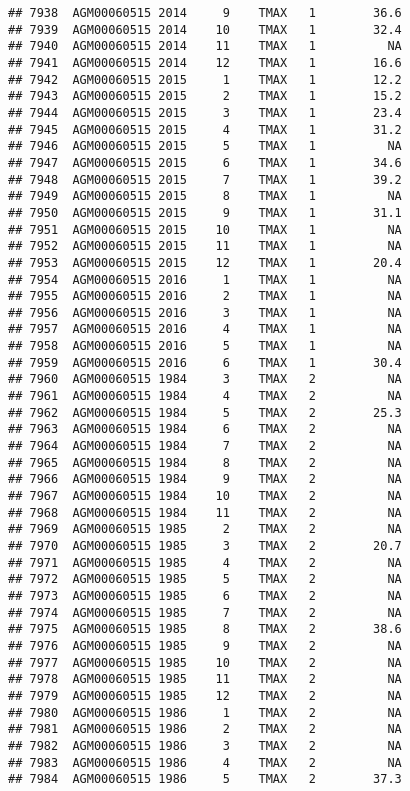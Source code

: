\documentclass{article}\usepackage[]{graphicx}\usepackage[]{color}
\makeatletter
\newenvironment{kframe}{%
 \def\at@end@of@kframe{}%
 \ifinner\ifhmode%
  \def\at@end@of@kframe{\end{minipage}}%
  \begin{minipage}{\columnwidth}%
 \fi\fi%
 \def\FrameCommand##1{\hskip\@totalleftmargin \hskip-\fboxsep
 \colorbox{shadecolor}{##1}\hskip-\fboxsep
     \hskip-\linewidth \hskip-\@totalleftmargin \hskip\columnwidth}%
 \MakeFramed {\advance\hsize-\width
   \@totalleftmargin\z@ \linewidth\hsize
   \@setminipage}}%
 {\par\unskip\endMakeFramed%
 \at@end@of@kframe}
\newenvironment{knitrout}{}{} %
\makeatother
\begin{document}
\begin{knitrout}
\begin{kframe}
\begin{verbatim}
## 7938  AGM00060515 2014     9    TMAX   1        36.6
## 7939  AGM00060515 2014    10    TMAX   1        32.4
## 7940  AGM00060515 2014    11    TMAX   1          NA
## 7941  AGM00060515 2014    12    TMAX   1        16.6
## 7942  AGM00060515 2015     1    TMAX   1        12.2
## 7943  AGM00060515 2015     2    TMAX   1        15.2
## 7944  AGM00060515 2015     3    TMAX   1        23.4
## 7945  AGM00060515 2015     4    TMAX   1        31.2
## 7946  AGM00060515 2015     5    TMAX   1          NA
## 7947  AGM00060515 2015     6    TMAX   1        34.6
## 7948  AGM00060515 2015     7    TMAX   1        39.2
## 7949  AGM00060515 2015     8    TMAX   1          NA
## 7950  AGM00060515 2015     9    TMAX   1        31.1
## 7951  AGM00060515 2015    10    TMAX   1          NA
## 7952  AGM00060515 2015    11    TMAX   1          NA
## 7953  AGM00060515 2015    12    TMAX   1        20.4
## 7954  AGM00060515 2016     1    TMAX   1          NA
## 7955  AGM00060515 2016     2    TMAX   1          NA
## 7956  AGM00060515 2016     3    TMAX   1          NA
## 7957  AGM00060515 2016     4    TMAX   1          NA
## 7958  AGM00060515 2016     5    TMAX   1          NA
## 7959  AGM00060515 2016     6    TMAX   1        30.4
## 7960  AGM00060515 1984     3    TMAX   2          NA
## 7961  AGM00060515 1984     4    TMAX   2          NA
## 7962  AGM00060515 1984     5    TMAX   2        25.3
## 7963  AGM00060515 1984     6    TMAX   2          NA
## 7964  AGM00060515 1984     7    TMAX   2          NA
## 7965  AGM00060515 1984     8    TMAX   2          NA
## 7966  AGM00060515 1984     9    TMAX   2          NA
## 7967  AGM00060515 1984    10    TMAX   2          NA
## 7968  AGM00060515 1984    11    TMAX   2          NA
## 7969  AGM00060515 1985     2    TMAX   2          NA
## 7970  AGM00060515 1985     3    TMAX   2        20.7
## 7971  AGM00060515 1985     4    TMAX   2          NA
## 7972  AGM00060515 1985     5    TMAX   2          NA
## 7973  AGM00060515 1985     6    TMAX   2          NA
## 7974  AGM00060515 1985     7    TMAX   2          NA
## 7975  AGM00060515 1985     8    TMAX   2        38.6
## 7976  AGM00060515 1985     9    TMAX   2          NA
## 7977  AGM00060515 1985    10    TMAX   2          NA
## 7978  AGM00060515 1985    11    TMAX   2          NA
## 7979  AGM00060515 1985    12    TMAX   2          NA
## 7980  AGM00060515 1986     1    TMAX   2          NA
## 7981  AGM00060515 1986     2    TMAX   2          NA
## 7982  AGM00060515 1986     3    TMAX   2          NA
## 7983  AGM00060515 1986     4    TMAX   2          NA
## 7984  AGM00060515 1986     5    TMAX   2        37.3

\end{verbatim}
\end{kframe}
\end{knitrout}
\end{document}
